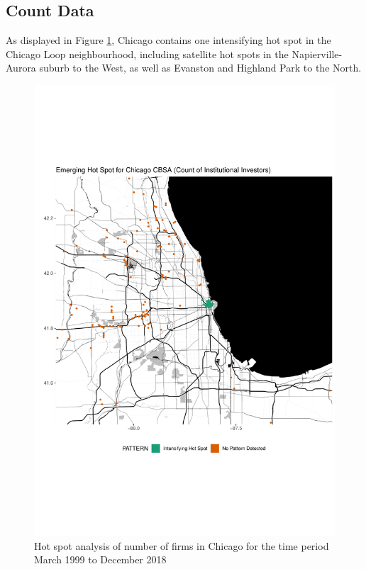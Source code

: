 \subsection{Count Data}
As displayed in Figure \ref{fig:Chicagocounthotspot}, Chicago contains one intensifying hot spot in the Chicago Loop neighbourhood, including satellite hot spots in the Napierville-Aurora suburb to the West, as well as Evanston and Highland Park to the North.  
\begin{figure}
	\centering
	\includegraphics[width=1\linewidth]{Figures/ChapterIV/Chi_Count_EH}
	\caption[Hot Spot Analysis of Number of Firms in Chicago CBSA 1999-2018]{Hot spot analysis of number of firms in Chicago for the time period March 1999 to December 2018}
	\label{fig:Chicagocounthotspot}
\end{figure}

